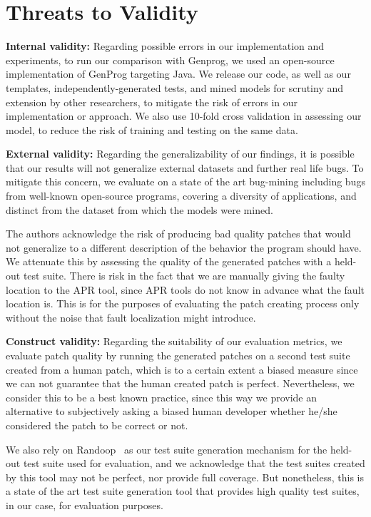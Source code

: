 \documentclass[conference]{IEEEtran}
\begin{document}
\section{Threats to Validity} \label{threatsVal}

\noindent\textbf{Internal validity:}
Regarding possible errors in our implementation and experiments, to run our
comparison with Genprog, we used an open-source implementation of GenProg
targeting Java. We release our code, as well as our templates,
independently-generated tests, and mined models for scrutiny and extension by other
researchers, to mitigate the risk of errors in our implementation or approach. 
 We also use 10-fold cross validation in
assessing our model, to reduce the risk of training and testing on the same
data.  

\noindent\textbf{External validity:} 
Regarding the generalizability of our findings, it is possible 
that our results will not generalize external datasets and further
real life bugs. To mitigate this concern, we evaluate 
on a state of the art bug-mining including bugs from well-known open-source
programs, covering a diversity of applications, and distinct from the dataset
from which the models were mined. 

The authors acknowledge the risk of producing bad quality patches that would not generalize
to a different description of the behavior the program should have. We attenuate this by 
assessing the quality of the generated patches with a held-out test suite.
There is risk in the fact that we are manually giving the
faulty location to the APR tool, since APR tools do not know in advance what the 
fault location is. This is for the purposes of evaluating the patch creating process
only without the noise that fault localization might introduce.

\noindent\textbf{Construct validity:}
Regarding the suitability of our evaluation metrics, we evaluate patch
quality by running the generated patches on a second test suite created
from a human patch, which is to a certain extent a biased measure since we can
not guarantee that the human created patch is perfect. Nevertheless, we consider this to be a
best known practice, since this way we provide an alternative to subjectively asking a biased human developer
whether he/she considered the patch to be correct or not. 

We also rely on Randoop~\cite{pacheco07} as our test suite generation mechanism for the held-out test suite used for evaluation, and we acknowledge that the test suites created by this tool may not be perfect, nor provide full coverage. But nonetheless, this is a state of the art test suite generation tool that provides high quality test suites, in our case, for evaluation purposes.
\end{document}
